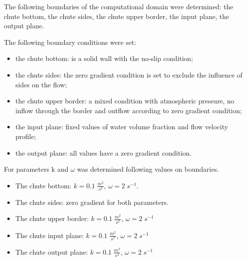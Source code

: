 \documentclass[sensors,article,submit,moreauthors,pdftex]{Definitions/mdpi}
\begin{document}
The following boundaries of the computational domain were determined: the chute bottom, the chute sides, the chute upper border, the input plane, the output plane.

The following boundary conditions were set:

\begin{itemize}
    \item the chute bottom: is a solid wall with the no-slip condition;
    \item the chute sides: the zero gradient condition is set to exclude the     influence of sides on the flow;
    \item the chute upper border: a mixed condition with atmospheric pressure,     no inflow through the border and outflow according to zero gradient     condition;
    \item the input plane: fixed values of water volume fraction and flow velocity profile;
    \item the output plane: all values have a zero gradient condition.
\end{itemize}

For parameters k and $\omega$ was determined following values on boundaries.

\begin{itemize}
    \item The chute bottom: $k=0.1\;\frac{m^2}{s^2}$, $\omega = 2 \; s^{-1}$.
    \item The chute sides: zero gradient for both parameters.
    \item The chute upper border: $k=0.1\;\frac{m^2}{s^2}$, $\omega = 2 \; s^{-1}$
    \item The chute input plane: $k=0.1\;\frac{m^2}{s^2}$, $\omega = 2 \; s^{-1}$
    \item The chute output plane: $k=0.1\;\frac{m^2}{s^2}$, $\omega = 2 \; s^{-1}$
\end{itemize}
\end{document}
